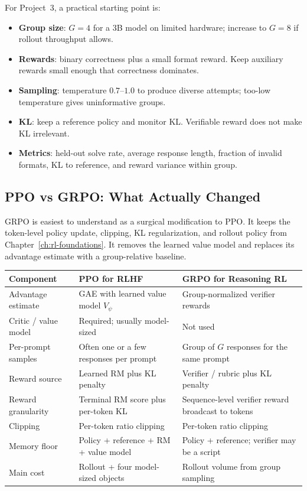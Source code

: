 For Project~3, a practical starting point is:

\begin{tcolorbox}[colback=orange!5, colframe=orange!60, title=\textbf{For Project~3: A GRPO Starting Recipe}]
\begin{itemize}[nosep]
  \item \textbf{Group size}: $G=4$ for a 3B model on limited hardware; increase to $G=8$ if rollout throughput allows.
  \item \textbf{Rewards}: binary correctness plus a small format reward. Keep auxiliary rewards small enough that correctness dominates.
  \item \textbf{Sampling}: temperature $0.7$--$1.0$ to produce diverse attempts; too-low temperature gives uninformative groups.
  \item \textbf{KL}: keep a reference policy and monitor KL. Verifiable reward does not make KL irrelevant.
  \item \textbf{Metrics}: held-out solve rate, average response length, fraction of invalid formats, KL to reference, and reward variance within group.
\end{itemize}
\end{tcolorbox}

\subsection{PPO vs GRPO: What Actually Changed}

GRPO is easiest to understand as a surgical modification to PPO. It keeps the token-level policy update, clipping, KL regularization, and rollout policy from Chapter~\ref{ch:rl-foundations}. It removes the learned value model and replaces its advantage estimate with a group-relative baseline.

\begin{center}
\small
\begin{tabularx}{\textwidth}{@{}lXX@{}}
\toprule
\textbf{Component} & \textbf{PPO for RLHF} & \textbf{GRPO for Reasoning RL} \\
\midrule
Advantage estimate & GAE with learned value model $V_\psi$ & Group-normalized verifier rewards \\
Critic / value model & Required; usually model-sized & Not used \\
Per-prompt samples & Often one or a few responses per prompt & Group of $G$ responses for the same prompt \\
Reward source & Learned RM plus KL penalty & Verifier / rubric plus KL penalty \\
Reward granularity & Terminal RM score plus per-token KL & Sequence-level verifier reward broadcast to tokens \\
Clipping & Per-token ratio clipping & Per-token ratio clipping \\
Memory floor & Policy + reference + RM + value model & Policy + reference; verifier may be a script \\
Main cost & Rollout + four model-sized objects & Rollout volume from group sampling \\
\bottomrule
\end{tabularx}
\normalsize
\end{center}


